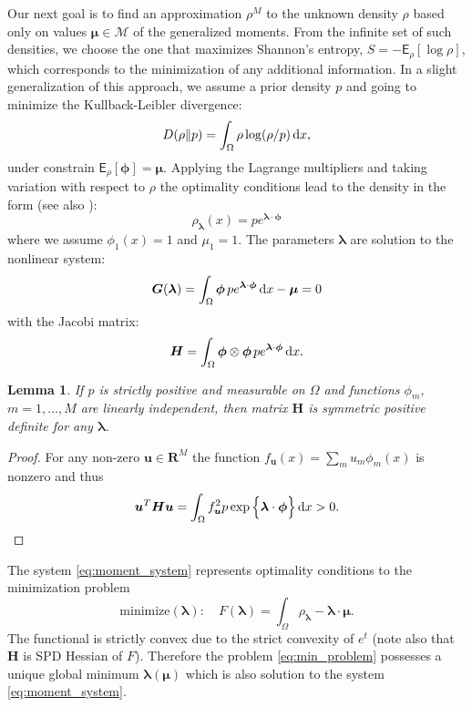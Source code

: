 \documentclass{article}
\newtheorem{lemma}[theorem]{Lemma}
\def\d{\,{\rm d}}               %
\def\vc#1{\mathbf{\boldsymbol{#1}}}     %
\def\tn#1{\boldsymbol{#1}}
\def \E{{\mathsf E}}
\def\R{\mathbf{R}}
\def\vl{{\vc\lambda}}
\def\vmu{\vc\mu}
\def\vphi{\vc\phi}
\begin{document}
Our next goal is to find an approximation $\rho^M$ to the unknown density $\rho$ based only on values $\vmu \in \mathcal M$ of the generalized moments. From the infinite set of such densities, we choose the one that maximizes Shannon's entropy,
$S = -\E_\rho[\log \rho]$,
which corresponds to the minimization of any additional information. 
In a slight generalization of this approach, we assume a prior density $p$ and going to minimize the Kullback-Leibler divergence:
\[
    D(\rho\Vert p) = \int_\Omega \rho \log(\rho / p) \d x,
\]
under constrain $\E_\rho[ \vphi ] = \vmu$. 
Applying the Lagrange multipliers and taking variation with respect to $\rho$ the optimality conditions lead to the density in the form (see also \cite{...}):
\[
    \rho_{\vl}(x) = p e^{\vl\cdot\vphi}
\]
where we assume $\phi_1(x) = 1$ and $\mu_1 =1$. The parameters $\vl$ are solution
to the nonlinear system:
\begin{equation}
    \label{eq:moment_system}
    \vc G(\vl) = \int_\Omega \vphi\, p e^{\vl\cdot \vphi}\d x - \vmu = 0
\end{equation}
with the Jacobi matrix:
\[
    \tn H = \int_\Omega \vphi \otimes \vphi\, 
    p e^{\vl\cdot\vphi} \d x.
\]
\begin{lemma}
If $p$ is strictly positive and measurable on $\Omega$ and functions $\phi_m$,  $m=1,\dots,M$ are linearly independent, then matrix $\tn H$ is symmetric positive definite for any $\vl$.
\end{lemma}
\begin{proof}
For any non-zero $\vc u \in \R^M$ the function $f_{\vc u}(x) = \sum_m u_m \phi_m(x)$ is nonzero and thus
\[
    \vc u^T \tn H \vc u = \int_{\Omega} f_{\vc u}^2 p \exp\Big\{ \vc\lambda\cdot \vc\phi\Big\} \d x > 0.
\]
\end{proof}
The system \eqref{eq:moment_system} represents optimality conditions to the minimization problem
\begin{equation}
    \label{eq:min_problem}
    \text{minimize}(\vc\lambda):\quad F(\vl) = \int_{\Omega} \rho_{\vl} - \vl\cdot\vmu.
\end{equation}
The functional is strictly convex due to the strict convexity of $e^t$ (note also that $\tn H$ is SPD Hessian of $F$). 
Therefore the problem \eqref{eq:min_problem} possesses a unique global minimum $\vl(\vmu)$ which is also solution to the system \eqref{eq:moment_system}.
\end{document}
